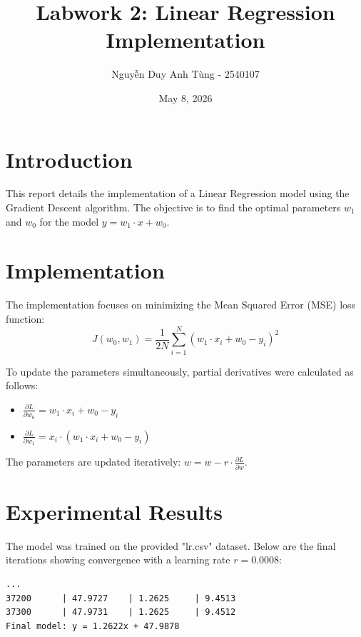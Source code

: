 \documentclass{article}
\title{Labwork 2: Linear Regression Implementation}
\author{Nguyễn Duy Anh Tùng - 2540107}
\date{May 8, 2026}
\begin{document}
\maketitle

\section{Introduction}
This report details the implementation of a Linear Regression model using the Gradient Descent algorithm. The objective is to find the optimal parameters $w_1$ and $w_0$ for the model $y = w_1 \cdot x + w_0$.

\section{Implementation}
The implementation focuses on minimizing the Mean Squared Error (MSE) loss function:
\begin{equation}
J(w_0, w_1) = \frac{1}{2N} \sum_{i=1}^{N} (w_1 \cdot x_i + w_0 - y_i)^2 
\end{equation}

To update the parameters simultaneously, partial derivatives were calculated as follows:
\begin{itemize}
    \item $\frac{\partial L}{\partial w_0} = w_1 \cdot x_i + w_0 - y_i$ 
    \item $\frac{\partial L}{\partial w_1} = x_i \cdot (w_1 \cdot x_i + w_0 - y_i)$ 
\end{itemize}

The parameters are updated iteratively: $w = w - r \cdot \frac{\partial L}{\partial w}$.

\section{Experimental Results}
The model was trained on the provided "lr.csv" dataset. Below are the final iterations showing convergence with a learning rate $r = 0.0008$:

\begin{center}
\begin{lstlisting}
...
37200      | 47.9727    | 1.2625     | 9.4513    
37300      | 47.9731    | 1.2625     | 9.4512
Final model: y = 1.2622x + 47.9878
\end{lstlisting}
\end{center}
\end{document}

